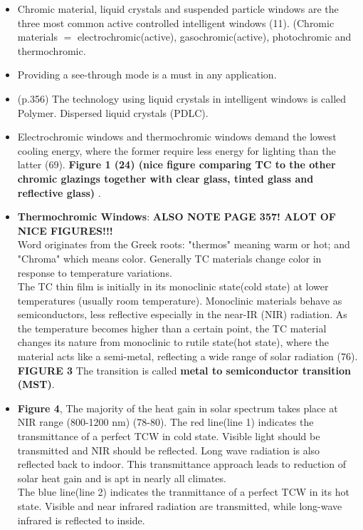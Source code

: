 \begin{itemize}
\begin{itemize}
   \end{itemize}
\item Chromic material, liquid crystals and suspended particle windows are the three most common
   active controlled intelligent windows (11). 
   (Chromic materials $=$ electrochromic(active), gasochromic(active),
   photochromic and thermochromic.
\item Providing a see-through mode is a must in any application.
\item (p.356) The technology using liquid crystals in intelligent windows is called Polymer.
   Dispersed liquid crystals (PDLC).
\item Electrochromic windows and thermochromic windows demand the lowest cooling energy, where the former
   require less energy for lighting than the latter (69). \textbf{Figure 1 (24) (nice figure comparing 
   TC to the other chromic glazings together with clear glass, tinted glass and reflective glass) }.
\item \textbf{Thermochromic Windows}: \textbf{ALSO NOTE PAGE 357! ALOT OF NICE FIGURES!!!}\\
   Word originates from the Greek roots: "thermos" meaning warm or hot; and "Chroma" which means color.
   Generally TC materials change color in response to temperature variations.\\
   The TC thin film is initially in its monoclinic state(cold state) at lower temperatures (usually
   room temperature). Monoclinic materials behave as semiconductors, less reflective especially in 
   the near-IR (NIR) radiation. As the temperature becomes higher than a certain point, the TC material
   changes its nature from monoclinic to rutile state(hot state), where the material acts like a 
   semi-metal, reflecting a wide range of solar radiation (76). \textbf{FIGURE 3}
   The transition is called \textbf{metal to semiconductor transition (MST)}.
\item \textbf{Figure 4}, The majority of the heat gain in solar spectrum takes place at NIR range
   (800-1200 nm) (78-80). The red line(line 1) indicates the transmittance of a perfect
   TCW in cold state. Visible light should be transmitted and NIR should be reflected. Long wave radiation
   is also reflected back to indoor. This transmittance approach leads to reduction of solar heat gain and is 
   apt in nearly all climates. \\
   The blue line(line 2) indicates the tranmittance of a perfect TCW in its hot state. Visible
   and near infrared radiation are transmitted, while long-wave infrared is reflected to inside.

\end{itemize}
